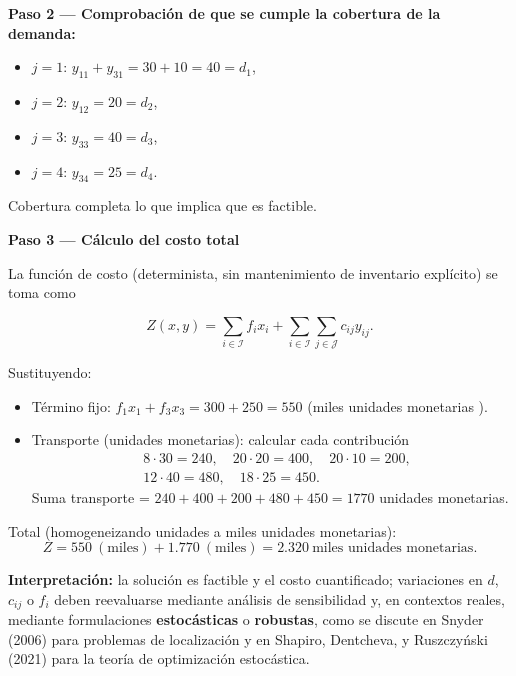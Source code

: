 \documentclass[
  spanish,
  us-letterpaper,
]{scrreprt}
\providecommand{\tightlist}{%
  \setlength{\itemsep}{0pt}\setlength{\parskip}{0pt}}
\numberwithin{equation}{section}
\begin{document}
\textbf{Paso 2 --- Comprobación de que se cumple la cobertura de la
demanda:}

\begin{itemize}
\tightlist
\item
  \(j=1\): \(y_{11}+y_{31}=30+10=40 = d_1\),
\item
  \(j=2\): \(y_{12}=20 = d_2\),
\item
  \(j=3\): \(y_{33}=40 = d_3\),
\item
  \(j=4\): \(y_{34}=25 = d_4\).
\end{itemize}

Cobertura completa lo que implica que es factible.

\textbf{Paso 3 --- Cálculo del costo total}

La función de costo (determinista, sin mantenimiento de inventario
explícito) se toma como

\[
Z(x,y)=\sum_{i\in\mathcal{I}} f_i x_i + \sum_{i\in\mathcal{I}}\sum_{j\in\mathcal{J}} c_{ij} y_{ij}.
\]

Sustituyendo:

\begin{itemize}
\tightlist
\item
  Término fijo: \(f_1 x_1 + f_3 x_3 = 300 + 250 = 550\) (miles unidades
  monetarias ).
\item
  Transporte (unidades monetarias): calcular cada contribución \[
  \begin{aligned}
  &8\cdot 30 = 240,\quad 20\cdot 20 = 400,\quad 20\cdot 10 = 200,\\
  &12\cdot 40 = 480,\quad 18\cdot 25 = 450.
  \end{aligned}
  \] Suma transporte = \(240+400+200+480+450 = 1770\) unidades
  monetarias.
\end{itemize}

Total (homogeneizando unidades a miles unidades monetarias): \[
Z = 550\ (\text{miles}) + 1.770\ (\text{miles}) = 2.320\ \text{miles unidades monetarias}.
\]

\textbf{Interpretación:} la solución es factible y el costo
cuantificado; variaciones en \(d\), \(c_{ij}\) o \(f_i\) deben
reevaluarse mediante análisis de sensibilidad y, en contextos reales,
mediante formulaciones \textbf{estocásticas} o \textbf{robustas}, como
se discute en Snyder (2006) para problemas de localización y en Shapiro,
Dentcheva, y Ruszczyński (2021) para la teoría de optimización
estocástica.
\end{document}
